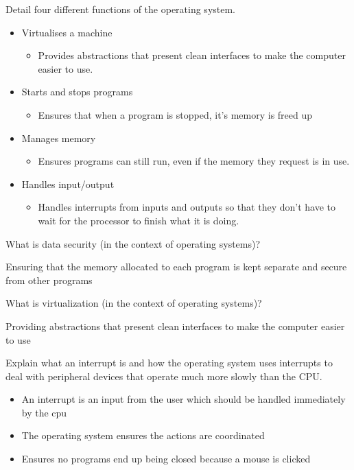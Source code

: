 \documentclass{exam}
\begin{document}
\begin{questions}
\question[4]Detail four different functions of the operating system.
\begin{solution}[2in]
	\begin{itemize}
		\item Virtualises a machine
		\begin{itemize}
			\item Provides abstractions that present clean interfaces to make the computer easier to use.
		\end{itemize}
		\item Starts and stops programs
		\begin{itemize}
			\item Ensures that when a program is stopped, it's memory is freed up
		\end{itemize}
		\item Manages memory
		\begin{itemize}
			\item Ensures programs can still run, even if the memory they request is in use.
		\end{itemize}
		\item Handles input/output
		\begin{itemize}
			\item Handles interrupts from inputs and outputs so that they don't have to wait for the processor to finish what it is doing.
		\end{itemize}
	\end{itemize}
\end{solution}
\newpage
\question[1]What is data security (in the context of operating systems)?
\begin{solution}[2in]
Ensuring that the memory allocated to each program is kept separate and secure from other programs
\end{solution}

\question[2]What is virtualization (in the context of operating systems)?
\begin{solution}[2in]
Providing abstractions that present clean interfaces to make the computer easier to use
\end{solution}

\question[4]Explain what an interrupt is and how the operating system uses interrupts to deal with peripheral devices that operate much more slowly than the CPU.
\begin{solution}[2in]
	\begin{itemize}
		\item An interrupt is an input from the user which should be handled immediately by the cpu
		\item The operating system ensures the actions are coordinated
		\item Ensures no programs end up being closed because a mouse is clicked
	\end{itemize}
\end{solution}


\end{questions}
\end{document}
